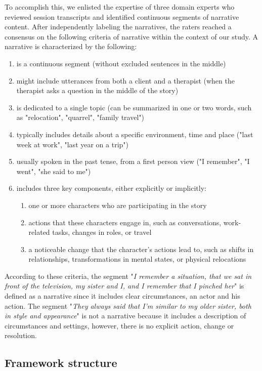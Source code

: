 \documentclass[preprint,12pt]{elsarticle}
\begin{document}
To accomplish this, we enlisted the expertise of three domain experts who reviewed session transcripts and identified continuous segments of narrative content. After independently labeling the narratives, the raters reached a consensus on the following criteria of narrative within the context of our study. A narrative is characterized by the following:
\begin{enumerate}
   \item 
   is a continuous segment (without excluded sentences in the middle)
    \item 
 might include utterances from both a client and a therapist (when the therapist asks a question in the middle of the story)
  \item 
 is dedicated to a single topic (can be summarized in one or two words, such as "relocation", "quarrel", "family travel")
  \item  
  typically includes details about a specific environment, time and place ("last week at work", "last year on a trip")
  \item 
  usually spoken in the past tense, from a first person view ("I remember", "I went", "she said to me")
    \item 
 includes three key components, either explicitly or implicitly:
 \begin{enumerate}
 \item one or more characters who are participating in the story
 \item actions that these characters engage in, such as conversations, work-related tasks, changes in roles, or travel
 \item a noticeable change that the character's actions lead to, such as shifts in relationships, transformations in mental states, or physical relocations
 \end{enumerate}
\end{enumerate}

According to these criteria, the segment "\emph{I remember a situation, that we sat in front of the television, my sister and I, and I remember that I pinched her}" is defined as a narrative since it includes clear circumstances, an actor and his action. The segment "\emph{They always said that I'm similar to my older sister, both in style and appearance}" is not a narrative because it includes a description of circumstances and settings, however, there is no explicit action, change or resolution.


\subsection{Framework structure}
\end{document}
